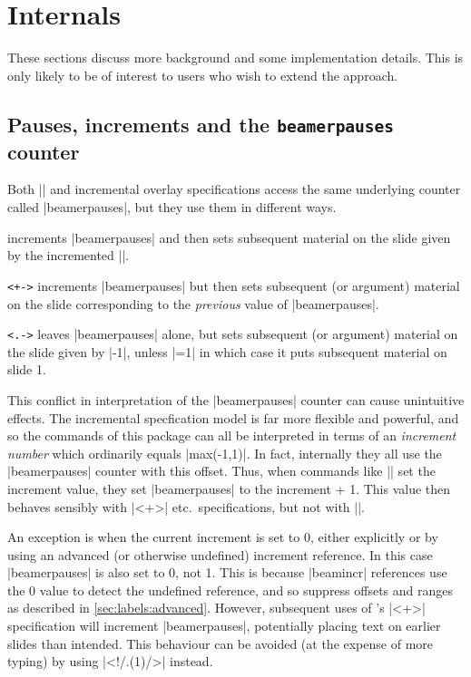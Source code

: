 \documentclass[a4paper]{ltxdoc}
\begin{document}
\section{Internals}\label{sec:internals}

These sections discuss more background and some implementation details.   This
is only likely to be of interest to users who wish to extend the approach.

\subsection{Pauses, increments and the \texttt{beamerpauses} counter}

Both |\pause| and incremental overlay specifications access the same underlying
counter called |beamerpauses|, but they use them in different ways.

\begin{command}{\pause}
  increments |beamerpauses| and then sets subsequent material on the slide
  given by the incremented |\value{beamerpauses}|. 
\end{command}

\begin{command}{\onslide\texttt{<+->}}
  increments |beamerpauses| but then sets subsequent (or argument) material on
  the slide corresponding to the \emph{previous} value of |beamerpauses|.
\end{command}

\begin{command}{\onslide\texttt{<.->}}
  leaves |beamerpauses| alone, but sets subsequent (or argument) material on the
  slide given by |\value{beamerpauses}-1|, unless |\value{beamerpauses}=1| in
  which case it puts subsequent material on slide 1.
\end{command}
%
This conflict in interpretation of the |beamerpauses| counter can cause
unintuitive effects.  The incremental specfication model is far more flexible
and powerful, and so the commands of this package can all be interpreted in
terms of an \emph{increment number} which ordinarily equals
|max(\value{beamerpauses}-1,1)|.  In fact, internally they all use the
|beamerpauses| counter with this offset.  Thus, when commands like |\resetincr|
set the increment value, they set |beamerpauses| to the increment + 1.  This
value then behaves sensibly with |<+>| etc.\ specifications, but not with
|\pause|.

An exception is when the current increment is set to 0, either explicitly or by
using an advanced (or otherwise undefined) increment reference.  In this case
|beamerpauses| is also set to 0, not 1.  This is because |beamincr| references
use the 0 value to detect the undefined reference, and so suppress offsets and
ranges as described in \cref{sec:labels:advanced}.  However, subsequent uses of
\beamer's |<+>| specification will increment |beamerpauses|, potentially placing
text on earlier slides than intended.  This behaviour can be avoided (at the
expense of more typing) by using |<!/.(1)/>| instead.
\end{document}
